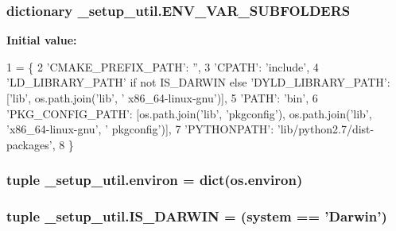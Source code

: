 \hypertarget{namespace__setup__util_aa31804f1be8660156ce9394b33c68dc4}{
\subsubsection[{E\-N\-V\-\_\-\-V\-A\-R\-\_\-\-S\-U\-B\-F\-O\-L\-D\-E\-R\-S}]{\setlength{\rightskip}{0pt plus 5cm}dictionary \-\_\-setup\-\_\-util.\-E\-N\-V\-\_\-\-V\-A\-R\-\_\-\-S\-U\-B\-F\-O\-L\-D\-E\-R\-S}}\label{namespace__setup__util_aa31804f1be8660156ce9394b33c68dc4}
{\bfseries Initial value\-:}
\begin{DoxyCode}
1 = \{
2     \textcolor{stringliteral}{'CMAKE\_PREFIX\_PATH'}: \textcolor{stringliteral}{''},
3     \textcolor{stringliteral}{'CPATH'}: \textcolor{stringliteral}{'include'},
4     \textcolor{stringliteral}{'LD\_LIBRARY\_PATH'} \textcolor{keywordflow}{if} \textcolor{keywordflow}{not} IS\_DARWIN \textcolor{keywordflow}{else} \textcolor{stringliteral}{'DYLD\_LIBRARY\_PATH'}: [\textcolor{stringliteral}{'lib'}, os.path.join(\textcolor{stringliteral}{'lib'}, \textcolor{stringliteral}{'
      x86\_64-linux-gnu'})],
5     \textcolor{stringliteral}{'PATH'}: \textcolor{stringliteral}{'bin'},
6     \textcolor{stringliteral}{'PKG\_CONFIG\_PATH'}: [os.path.join(\textcolor{stringliteral}{'lib'}, \textcolor{stringliteral}{'pkgconfig'}), os.path.join(\textcolor{stringliteral}{'lib'}, \textcolor{stringliteral}{'x86\_64-linux-gnu'}, \textcolor{stringliteral}{'
      pkgconfig'})],
7     \textcolor{stringliteral}{'PYTHONPATH'}: \textcolor{stringliteral}{'lib/python2.7/dist-packages'},
8 \}
\end{DoxyCode}
\hypertarget{namespace__setup__util_a0a3189a3fa13a696964c791ed2a5ea85}{
\subsubsection[{environ}]{\setlength{\rightskip}{0pt plus 5cm}tuple \-\_\-setup\-\_\-util.\-environ = dict(os.\-environ)}}\label{namespace__setup__util_a0a3189a3fa13a696964c791ed2a5ea85}
\hypertarget{namespace__setup__util_aecbb100ce6f94bb3c7e16d58fde05f96}{
\subsubsection[{I\-S\-\_\-\-D\-A\-R\-W\-I\-N}]{\setlength{\rightskip}{0pt plus 5cm}tuple \-\_\-setup\-\_\-util.\-I\-S\-\_\-\-D\-A\-R\-W\-I\-N = ({\bf system} == 'Darwin')}}\label{namespace__setup__util_aecbb100ce6f94bb3c7e16d58fde05f96}
